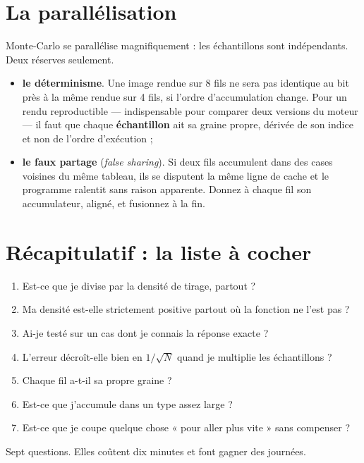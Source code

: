 \section{La parallélisation}

Monte-Carlo se parallélise magnifiquement : les échantillons sont indépendants.
Deux réserves seulement.

\begin{itemize}
  \item \textbf{le déterminisme}. Une image rendue sur 8 fils ne sera pas
        identique au bit près à la même rendue sur 4 fils, si l'ordre
        d'accumulation change. Pour un rendu reproductible — indispensable
        pour comparer deux versions du moteur — il faut que chaque
        \textbf{échantillon} ait sa graine propre, dérivée de son indice et non
        de l'ordre d'exécution ;
  \item \textbf{le faux partage} (\emph{false sharing}). Si deux fils
        accumulent dans des cases voisines du même tableau, ils se disputent la
        même ligne de cache et le programme ralentit sans raison apparente.
        Donnez à chaque fil son accumulateur, aligné, et fusionnez à la fin.
\end{itemize}

\section{Récapitulatif : la liste à cocher}

\begin{nkretenir}
\begin{enumerate}
  \item Est-ce que je divise par la densité de tirage, partout ?
  \item Ma densité est-elle strictement positive partout où la fonction ne
        l'est pas ?
  \item Ai-je testé sur un cas dont je connais la réponse exacte ?
  \item L'erreur décroît-elle bien en $1/\sqrt{N}$ quand je multiplie les
        échantillons ?
  \item Chaque fil a-t-il sa propre graine ?
  \item Est-ce que j'accumule dans un type assez large ?
  \item Est-ce que je coupe quelque chose « pour aller plus vite » sans
        compenser ?
\end{enumerate}
Sept questions. Elles coûtent dix minutes et font gagner des journées.
\end{nkretenir}

